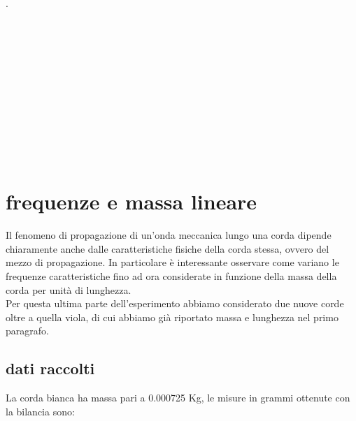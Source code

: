 \documentclass[a4paper]{article}
\theoremstyle{definition}
\begin{document}
\begin{figure}[!htbp]
\end{figure}
.\\\\\\\\\\\\\\\\\\\\\\\\
\section{frequenze e massa lineare}
Il fenomeno di propagazione di un'onda meccanica lungo una corda dipende chiaramente anche dalle caratteristiche fisiche della corda stessa, ovvero del mezzo di propagazione. In particolare è interessante osservare come variano le frequenze caratteristiche fino ad ora considerate in funzione della massa della corda per unità di lunghezza.\\
Per questa ultima parte dell'esperimento abbiamo considerato due nuove corde oltre a quella viola, di cui abbiamo già riportato massa e lunghezza nel primo paragrafo.
\subsection{dati raccolti}
La corda bianca ha massa pari a 0.000725 Kg, le misure in grammi ottenute con la bilancia sono:
\begin{figure}[!ht]
\end{figure}
\end{document}
